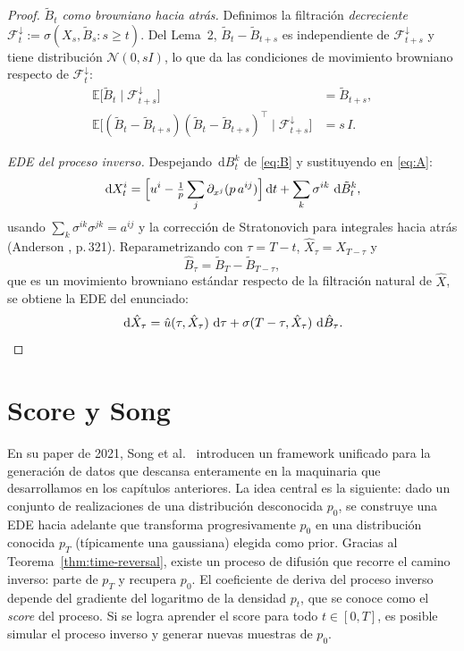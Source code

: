 \documentclass[12pt, a4paper]{report}
\theoremstyle{plain}
\theoremstyle{definition}
\theoremstyle{remark}
\newcommand{\E}{\mathbb{E}}
\newcommand{\dd}{\,\mathrm{d}}
\begin{document}
\begin{proof}
\smallskip
\noindent\emph{$\tilde{B}_t$ como browniano hacia atrás.}
Definimos la filtración \emph{decreciente} $\mathcal{F}^\downarrow_t := \sigma(X_s,\tilde{B}_s:s\geq t)$. Del Lema~2, $\tilde{B}_t-\tilde{B}_{t+s}$ es independiente de $\mathcal{F}^\downarrow_{t+s}$ y tiene distribución $\mathcal{N}(0,sI)$, lo que da las condiciones de movimiento browniano respecto de $\mathcal{F}^\downarrow_t$:
\begin{align*}
  \E\bigl[\tilde{B}_t \mid \mathcal{F}^\downarrow_{t+s}\bigr] &= \tilde{B}_{t+s}, \\
  \E\bigl[(\tilde{B}_t-\tilde{B}_{t+s})(\tilde{B}_t-\tilde{B}_{t+s})^\top \mid \mathcal{F}^\downarrow_{t+s}\bigr]
    &= s\,I.
\end{align*}

\smallskip
\noindent\emph{EDE del proceso inverso.}
Despejando $\dd B_t^k$ de \eqref{eq:B} y sustituyendo en \eqref{eq:A}:
\[
  \dd X_t^i
  = \Bigl[u^i - \tfrac{1}{p}\sum_j\partial_{x^j}(p\,a^{ij})\Bigr]\dd t
  + \sum_k\sigma^{ik}\,\dd\tilde{B}_t^k,
\]
usando $\sum_k\sigma^{ik}\sigma^{jk}=a^{ij}$ y la corrección de Stratonovich para integrales hacia atrás (Anderson \cite{Anderson1982}, p.\,321). Reparametrizando con $\tau=T-t$, $\hat{X}_\tau=X_{T-\tau}$ y
\[
  \hat{B}_\tau = \tilde{B}_T - \tilde{B}_{T-\tau},
\]
que es un movimiento browniano estándar respecto de la filtración natural de $\hat{X}$, se obtiene la EDE del enunciado:
\[
  \dd\hat{X}_\tau = \hat{u}(\tau,\hat{X}_\tau)\,\dd\tau
  + \sigma(T-\tau,\hat{X}_\tau)\,\dd\hat{B}_\tau. \qedhere
\]
\end{proof}

\chapter{Score y Song}
\label{chap:score}

En su paper de 2021, Song et al.\ \cite{Song2021} introducen un framework unificado para la generación de datos que descansa enteramente en la maquinaria que desarrollamos en los capítulos anteriores. La idea central es la siguiente: dado un conjunto de realizaciones de una distribución desconocida $p_0$, se construye una EDE hacia adelante que transforma progresivamente $p_0$ en una distribución conocida $p_T$ (típicamente una gaussiana) elegida como prior. Gracias al Teorema~\ref{thm:time-reversal}, existe un proceso de difusión que recorre el camino inverso: parte de $p_T$ y recupera $p_0$. El coeficiente de deriva del proceso inverso depende del gradiente del logaritmo de la densidad $p_t$, que se conoce como el \emph{score} del proceso. Si se logra aprender el score para todo $t \in [0, T]$, es posible simular el proceso inverso y generar nuevas muestras de $p_0$.
\end{document}
